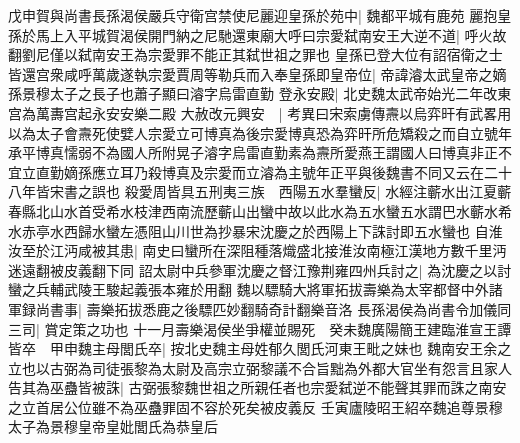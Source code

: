 戊申賀與尚書長孫渴侯嚴兵守衛宫禁使尼麗迎皇孫於苑中|{
	魏都平城有鹿苑}
麗抱皇孫於馬上入平城賀渴侯開門納之尼馳還東廟大呼曰宗愛弑南安王大逆不道|{
	呼火故翻劉尼僅以弑南安王為宗愛罪不能正其弑世祖之罪也}
皇孫已登大位有詔宿衛之士皆還宫衆咸呼萬歲遂執宗愛賈周等勒兵而入奉皇孫即皇帝位|{
	帝諱濬太武皇帝之嫡孫景穆太子之長子也蕭子顯曰濬字烏雷直勤}
登永安殿|{
	北史魏太武帝始光二年改東宫為萬夀宫起永安安樂二殿}
大赦改元興安　|{
	考異曰宋索虜傳燾以烏弈旰有武畧用以為太子會燾死使嬖人宗愛立可博真為後宗愛博真恐為弈旰所危矯殺之而自立號年承平博真懦弱不為國人所附晃子濬字烏雷直勤素為燾所愛燕王謂國人曰博真非正不宜立直勤嫡孫應立耳乃殺博真及宗愛而立濬為主號年正平與後魏書不同又云在二十八年皆宋書之誤也}
殺愛周皆具五刑夷三族　西陽五水羣蠻反|{
	水經注蘄水出江夏蘄春縣北山水首受希水枝津西南流歷蘄山出蠻中故以此水為五水蠻五水謂巴水蘄水希水赤亭水西歸水蠻左憑阻山川世為抄暴宋沈慶之於西陽上下誅討即五水蠻也}
自淮汝至於江沔咸被其患|{
	南史曰蠻所在深阻種落熾盛北接淮汝南極江漢地方數千里沔迷遠翻被皮義翻下同}
詔太尉中兵參軍沈慶之督江豫荆雍四州兵討之|{
	為沈慶之以討蠻之兵輔武陵王駿起義張本雍於用翻}
魏以驃騎大將軍拓拔壽樂為太宰都督中外諸軍録尚書事|{
	壽樂拓拔悉鹿之後驃匹妙翻騎奇計翻樂音洛}
長孫渴侯為尚書令加儀同三司|{
	賞定策之功也}
十一月壽樂渴侯坐爭權並賜死　癸未魏廣陽簡王建臨淮宣王譚皆卒　甲申魏主母閭氏卒|{
	按北史魏主母姓郁久閭氏河東王毗之妹也}
魏南安王余之立也以古弼為司徒張黎為太尉及高宗立弼黎議不合旨黜為外都大官坐有怨言且家人告其為巫蠱皆被誅|{
	古弼張黎魏世祖之所親任者也宗愛弑逆不能聲其罪而誅之南安之立首居公位雖不為巫蠱罪固不容於死矣被皮義反}
壬寅廬陵昭王紹卒魏追尊景穆太子為景穆皇帝皇妣閭氏為恭皇后

